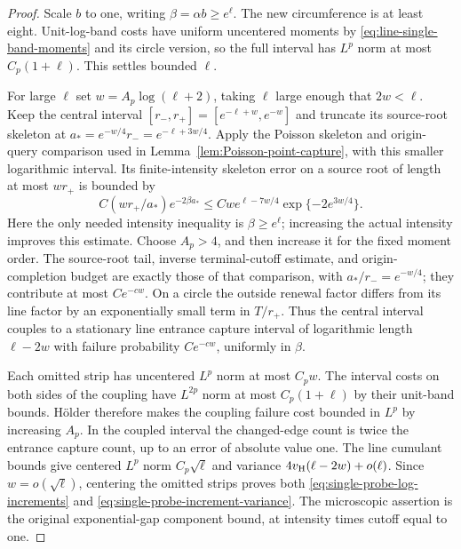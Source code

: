 \documentclass[11pt,letterpaper]{article}
\begin{document}
\begin{proof}
Scale $b$ to one, writing $\beta=\alpha b\ge e^\ell$.
The new circumference is at least eight.
Unit-log-band costs have uniform uncentered moments by
\eqref{eq:line-single-band-moments} and its circle version,
so the full interval has $L^p$ norm at most $C_p(1+\ell)$.
This settles bounded $\ell$.

For large $\ell$ set $w=A_p\log(\ell+2)$, taking $\ell$
large enough that $2w<\ell$.
Keep the central interval
$[r_-,r_+]=[e^{-\ell+w},e^{-w}]$ and truncate its source-root
skeleton at $a_*=e^{-w/4}r_-=e^{-\ell+3w/4}$.
Apply the Poisson skeleton and origin-query comparison used in
Lemma~\ref{lem:Poisson-point-capture}, with this smaller
logarithmic interval. Its finite-intensity skeleton error on a
source root of length at most $wr_+$ is bounded by
\[
 C(wr_+/a_*)e^{-2\beta a_*}
 \le Cw e^{\ell-7w/4}\exp\{-2e^{3w/4}\}.
\]
Here the only needed intensity inequality is $\beta\ge e^\ell$;
increasing the actual intensity improves this estimate.
Choose $A_p>4$, and then increase it for the fixed moment order.
The source-root tail, inverse terminal-cutoff estimate, and
origin-completion budget are exactly those of that comparison,
with $a_*/r_-=e^{-w/4}$; they contribute at most $Ce^{-cw}$.
On a circle the outside renewal factor differs from its line
factor by an exponentially small term in $T/r_+$.
Thus the central interval couples to a stationary line
entrance capture interval of logarithmic length $\ell-2w$
with failure probability $Ce^{-cw}$, uniformly in $\beta$.

Each omitted strip has uncentered $L^p$ norm at most $C_pw$.
The interval costs on both sides of the coupling have
$L^{2p}$ norm at most $C_p(1+\ell)$ by their unit-band
bounds. H\"older therefore makes the coupling failure cost
bounded in $L^p$ by increasing $A_p$.
In the coupled interval the changed-edge count is twice the
entrance capture count, up to an error of absolute value one.
The line cumulant bounds give centered $L^p$ norm $C_p\sqrt\ell$
and variance $4v_{\rm H}(\ell-2w)+o(\ell)$.
Since $w=o(\sqrt\ell)$, centering the omitted strips proves
both \eqref{eq:single-probe-log-increments} and
\eqref{eq:single-probe-increment-variance}.
The microscopic assertion is the original exponential-gap
component bound, at intensity times cutoff equal to one.
\end{proof}
\end{document}
